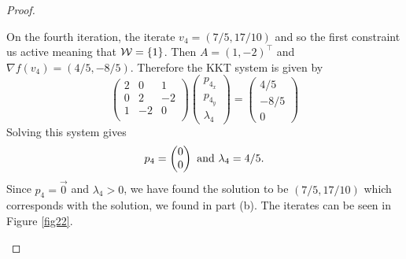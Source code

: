 \documentclass[12pt]{report}
\begin{document}
\begin{problem}
\begin{proof}
\begin{enumerate}
    On the fourth iteration, the iterate $v_4 = (7/5,17/10)$ and so the first constraint us active meaning that $\mathcal{W} = {\left\{1\right\}}$. Then $A = (1, -2)^\top$ and $\nabla f(v_4) = (4/5, -8/5)$. Therefore the KKT system is given by
    \begin{equation*}
        \begin{pmatrix}
            2 & 0 & 1\\
            0 & 2 & -2\\
            1 & -2 & 0\\
        \end{pmatrix}\begin{pmatrix}
            p_{4_x}\\p_{4_y}\\\lambda_4
        \end{pmatrix}=\begin{pmatrix}
            4/5\\-8/5\\0
        \end{pmatrix}
    \end{equation*}
    Solving this system gives
    \begin{equation*}
        p_4 = \begin{pmatrix}
            0 \\ 0
        \end{pmatrix} {~\text{and}~} \lambda_4 = 4/5.
    \end{equation*}
    Since $p_4 = \vec{0}$ and $\lambda_4 > 0$, we have found the solution to be $(7/5,17/10)$ which corresponds with the solution, we found in part (b). The iterates can be seen in Figure \ref{fig22}.

    
    
    
    

\end{enumerate}
\end{proof}
\end{problem}
\end{document}
